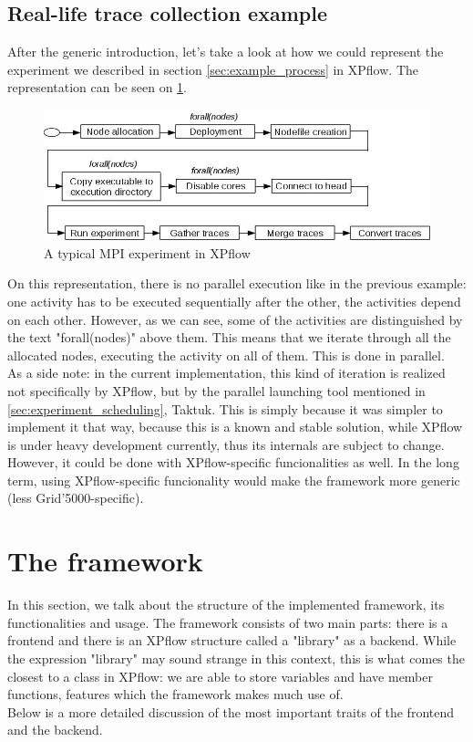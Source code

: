 \subsection{Real-life trace collection example}
After the generic introduction, let's take a look at how we could
represent the experiment we described in section
\ref{sec:example_process} in XPflow. The representation can be seen on
\ref{fig:xpflow_example2}.
\begin{figure}[htbp]
  \centering
    \includegraphics[scale=0.5]{./Figures/xpflow_example2.jpg}
  \caption[MPI experiment example in XPflow]{A typical MPI experiment
    in XPflow}
  \label{fig:xpflow_example2}
\end{figure}
On this representation, there is no parallel execution like in the
previous example: one activity has to be executed sequentially after
the other, the activities depend on each other. However, as we can
see, some of the activities are distinguished by the text
"forall(nodes)" above them. This means that we iterate through all the
allocated nodes, executing the activity on all of them. This is done
in parallel.\\[0.3cm]
As a side note: in the current implementation, this kind of iteration
is realized not
specifically by XPflow, but by the parallel launching tool mentioned
in \ref{sec:experiment_scheduling}, Taktuk\cite{chr09}. This is simply
because it was simpler to implement it that way, because this is a
known and stable solution, while XPflow is under heavy development
currently, thus its internals are subject to change. However, it could
be done with XPflow-specific funcionalities as well. In the long term,
using XPflow-specific funcionality would make the framework more
generic (less Grid'5000-specific).
\section{The framework}
In this section, we talk about the structure of the implemented
framework, its functionalities and usage.
The framework consists of two main parts: there is a frontend and
there is an XPflow structure called a "library" as a backend. While
the expression "library" may sound strange in this context, this is
what comes the closest to a class in XPflow: we are able to store
variables and have member functions, features which the framework
makes much use of.\\[0.3cm]
Below is a more detailed discussion of the most important traits of
the frontend and the backend.
